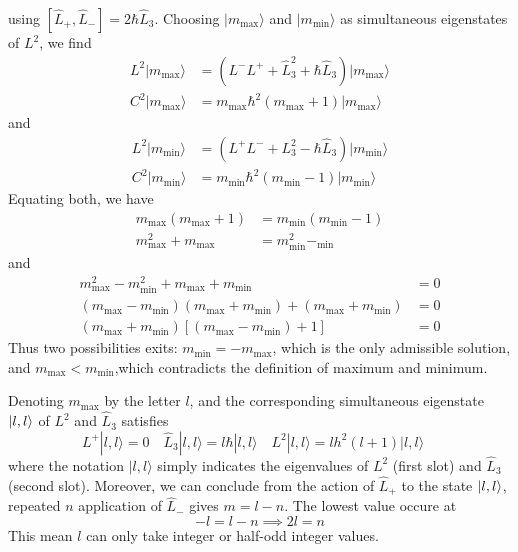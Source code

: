 \documentclass[../../../main.tex]{subfiles}
\begin{document}
using $    [\hat{L}_+,\hat{L}_-]=2 \hbar \hat{L}_3$.
Choosing $| m_{\text{max}} \rangle$ and $| m_{\text{min}} \rangle$ as simultaneous eigenstates of $L^2$, we find
\begin{align*}
    L^2 | m_{\text{max}} \rangle & =   \left( L^- L^+ +  \hat{L}_3^2 +\hbar  \hat{L}_3 \right) | m_{\text{max}} \rangle \\
    C^2 | m_{\text{max}} \rangle
                                 & =  m_{\text{max}} \hbar ^2(m_{\text{max}} + 1) | m_{\text{max}} \rangle
\end{align*}
and
\begin{align*}
    L^2 |m_\text{min}\rangle & = \left( L^+ L^- + L^2_3 -\hbar  \hat{L}_3 \right) |m_\text{min}\rangle \\
    C^2 |m_\text{min}\rangle
                             & =  m_\text{min} \hbar ^2 (m_\text{min} - 1) |m_\text{min}\rangle
\end{align*}
Equating both, we have
\begin{align*}
    m_{\text{max}} (m_{\text{max}} + 1) & =   m_\text{min} (m_\text{min} - 1) \\
    m^2_{\text{max}} + m_{\text{max}}   & =  m^2_{\text{min}} -_{\text{min}}
\end{align*}
and
\begin{align*}
    m^2_{\text{max}} - m^2_{\text{min}} + m_{\text{max}} + m_{\text{min}}                                  & = 0  \\
    (m_{\text{max}} - m_{\text{min}})(m_{\text{max}} + m_{\text{min}}) + (m_{\text{max}} + m_{\text{min}}) & = 0  \\
    (m_{\text{max}} + m_{\text{min}})\left[(m_{\text{max}} - m_{\text{min}}) + 1\right]                    & =  0
\end{align*}
Thus two possibilities exits: $m_\text{min} = -m_\text{max}$, which is the only admissible solution, and $m_\text{max} < m_\text{min}$,which contradicts the definition of maximum and minimum.

Denoting  $m_{\text{max}}$ by the letter $l$, and the corresponding simultaneous eigenstate $\ket{l,l}$ of  $L^2$ and $\hat{L}_3$  satisfies
\begin{equation*}
    L^+ |l, l\rangle = 0\quad
    \hat{L}_3 |l, l\rangle = l \hbar  |l, l\rangle\quad
    L^2 |l, l\rangle  = l h^2(l + 1) |l, l\rangle\quad
\end{equation*}
where the notation $\lvert l, l \rangle$ simply indicates the eigenvalues of $L^2$ (first slot) and $\hat{L}_3$ (second slot).
Moreover, we can conclude from the action of $\hat{L}_+$ to the state $\ket{l,l}$, repeated $n$ application of $\hat{L}_-$ gives $m=l-n$.
The lowest value occure  at
\begin{equation*}
    -l= l-n \implies 2l=n
\end{equation*}
This mean  $l$ can only take integer or half-odd integer values.
\end{document}
